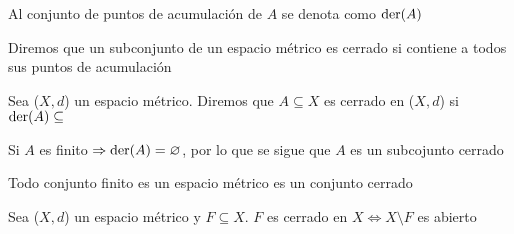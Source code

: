 \begin{notation}
    Al conjunto de puntos de acumulación de $A$ se denota como $\mathrm{der}(A)$
\end{notation}

\begin{remark}
    Diremos que un subconjunto de un espacio métrico es cerrado si contiene a todos sus puntos de acumulación
\end{remark}

\begin{definition}
    Sea ($X,d$) un espacio métrico. Diremos que $A \subseteq X$ es cerrado en ($X,d$) si $\mathrm{der}(A) \subseteq$
\end{definition}

\begin{remark}
    Si $A$ es finito $\Rightarrow \mathrm{der}(A) = \varnothing$, por lo que se sigue que $A$ es un subcojunto cerrado
\end{remark}

\begin{corollary}
    Todo conjunto finito es un espacio métrico es un conjunto cerrado
\end{corollary}

\begin{theorem}
    Sea ($X,d$) un espacio métrico y $F \subseteq X$. $F$ es cerrado en $X \iff X \setminus F$ es abierto
\end{theorem}

